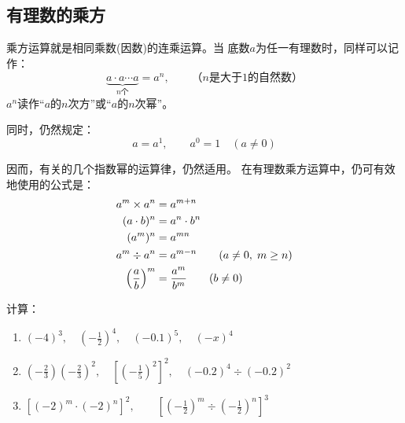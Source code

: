 \subsection{有理数的乘方}
乘方运算就是相同乘数(因数)的连乘运算。当
底数$a$为任一有理数时，同样可以记作：
\[\underbrace{a\cdot a\cdots a}_{n\text{个}} =a^n,\qquad \text{（$n$是大于1的自然数）}  \]
$a^n$读作“$a$的$n$次方”或“$a$的$n$次幂”。

同时，仍然规定：
\[a=a^1,\qquad a^0=1\quad (a\ne 0) \]

因而，有关的几个指数幂的运算律，仍然适用。
在有理数乘方运算中，仍可有效地使用的公式是：
\[\begin{split}
a^m\times a^n &=a^{m+n}\\
(a\cdot b)^n&=a^n\cdot b^n\\
(a^m)^n&=a^{mn}\\
a^m\div a^n&=a^{m-n}\qquad (a\ne 0,\; m\ge n)\\
\left(\dfrac{a}{b}\right)^m&=\dfrac{a^m}{b^m}\qquad (b\ne 0)
\end{split}\]



\begin{example}
	计算：
	\begin{enumerate}
		\item $(-4)^3,\quad \left(-\frac{1}{2}\right)^4,\quad (-0.1)^5,\quad (-x)^4$
		\item $\left(-\frac{2}{3}\right)\left(-\frac{2}{3}\right)^2,\quad \left[\left(-\frac{1}{5}\right)^2\right]^2,\quad (-0.2)^4\div (-0.2)^2$
		\item $\left[(-2)^m\cdot (-2)^n\right]^2,\qquad \left[\left(-\frac{1}{2}\right)^m\div \left(-\frac{1}{2}\right)^n\right]^3$
	\end{enumerate}
\end{example}

